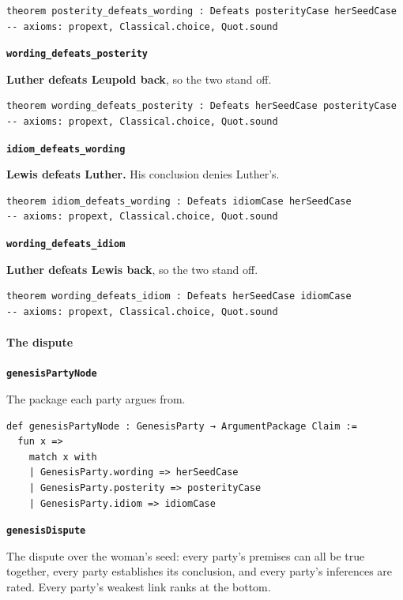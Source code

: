 \documentclass[11pt]{article}
\begin{document}
{\small\begin{verbatim}
theorem posterity_defeats_wording : Defeats posterityCase herSeedCase
-- axioms: propext, Classical.choice, Quot.sound
\end{verbatim}}
\par\medskip\noindent\textbf{\texttt{wording\_\allowbreak{}defeats\_\allowbreak{}posterity}}\par\nobreak\noindent
\textbf{Luther defeats Leupold back}, so the two stand off.

{\small\begin{verbatim}
theorem wording_defeats_posterity : Defeats herSeedCase posterityCase
-- axioms: propext, Classical.choice, Quot.sound
\end{verbatim}}
\par\medskip\noindent\textbf{\texttt{idiom\_\allowbreak{}defeats\_\allowbreak{}wording}}\par\nobreak\noindent
\textbf{Lewis defeats Luther.} His conclusion denies Luther’s.

{\small\begin{verbatim}
theorem idiom_defeats_wording : Defeats idiomCase herSeedCase
-- axioms: propext, Classical.choice, Quot.sound
\end{verbatim}}
\par\medskip\noindent\textbf{\texttt{wording\_\allowbreak{}defeats\_\allowbreak{}idiom}}\par\nobreak\noindent
\textbf{Luther defeats Lewis back}, so the two stand off.

{\small\begin{verbatim}
theorem wording_defeats_idiom : Defeats herSeedCase idiomCase
-- axioms: propext, Classical.choice, Quot.sound
\end{verbatim}}
\paragraph*{The dispute}
\leavevmode\par\nobreak
\par\medskip\noindent\textbf{\texttt{genesis\allowbreak{}Party\allowbreak{}Node}}\par\nobreak\noindent
The package each party argues from.

{\small\begin{verbatim}
def genesisPartyNode : GenesisParty → ArgumentPackage Claim :=
  fun x =>
    match x with
    | GenesisParty.wording => herSeedCase
    | GenesisParty.posterity => posterityCase
    | GenesisParty.idiom => idiomCase
\end{verbatim}}
\par\medskip\noindent\textbf{\texttt{genesis\allowbreak{}Dispute}}\par\nobreak\noindent
The dispute over the woman’s seed: every party’s premises can all be true together, every party establishes its conclusion, and every party’s inferences are rated. Every party’s weakest link ranks at the bottom.
\end{document}
